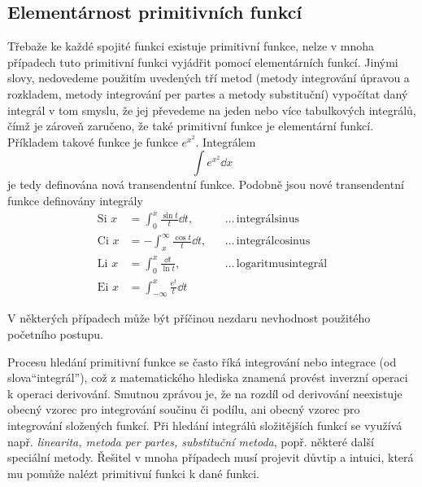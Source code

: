     \subsection{Elementárnost primitivních funkcí}   
      Třebaže ke každé spojité funkci existuje primitivní funkce, nelze v mnoha případech tuto
      primitivní funkci vyjádřit pomocí elementárních funkcí. Jinými slovy, nedovedeme použitím
      uvedených tří metod (metody integrování úpravou a rozkladem, metody integrování per partes a
      metody substituční) vypočítat daný integrál v tom smyslu, že jej převedeme na jeden nebo více
      tabulkových integrálů, čímž je zároveň zaručeno, že také primitivní funkce je elementární
      funkcí. Příkladem takové funkce je funkce
      \(e^{x^2}\). Integrálem
      \begin{equation*}
        \int e^{x^2}\dd{x}
      \end{equation*}
      je tedy definována nová transendentní funkce. Podobně jsou nové transendentní funkce
      definovány integrály
      \begin{align*}
        \text{Si }x &= \int_0^x     \frac{\sin t}{t}\dd{t},&&\ldots\,\text{integrálsinus}       \\
        \text{Ci }x &=-\int_x^\infty\frac{\cos t}{t}\dd{t},&&\ldots\,\text{integrálcosinus}     \\
        \text{Li }x &= \int_0^x     \frac{\dd{t}}{\ln t},  &&\ldots\,\text{logaritmusintegrál}  \\
        \text{Ei }x &= \int_{-\infty}^x \frac{e^t}{t}\dd{t}&&   
      \end{align*}

      V některých případech může být příčinou nezdaru nevhodnost použitého početního postupu. 

    Procesu hledání primitivní funkce se často říká integrování nebo integrace (od slova“integrál”),
    což z matematického hlediska znamená provést inverzní operaci k operaci derivování. Smutnou
    zprávou je, že na rozdíl od derivování neexistuje obecný vzorec pro integrování součinu či
    podílu, ani obecný vzorec pro integrování složených funkcí. Při hledání integrálů složitějších
    funkcí se využívá např. \emph{linearita, metoda per partes, substituční metoda}, popř. některé
    další speciální metody. Řešitel v mnoha případech musí projevit důvtip a intuici, která mu
    pomůže nalézt primitivní funkci k dané funkci.

